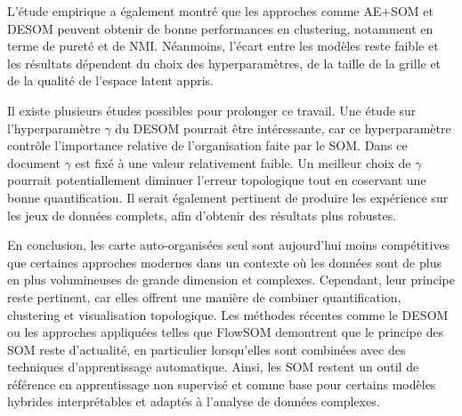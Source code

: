 \documentclass[12pt,a4paper]{report}
\begin{document}
L'étude empirique a également montré que les approches comme AE+SOM et DESOM peuvent obtenir de bonne performances en clustering,
notamment en terme de pureté et de NMI. Néanmoins, l'écart entre les modèles reste faible et les résultats dépendent du choix 
des hyperparamètres, de la taille de la grille et de la qualité de l'espace latent appris.

Il existe plusieurs études possibles pour prolonger ce travail.
Une étude sur l'hyperparamètre $\gamma$ du DESOM pourrait être intéressante, car ce hyperparamètre contrôle l'importance relative de l'organisation faite par le SOM.
Dans ce document $\gamma$ est fixé à une valeur relativement faible. Un meilleur choix de $\gamma$ pourrait 
potentiallement diminuer l'erreur topologique tout en coservant une bonne quantification.
Il serait également pertinent de produire les expérience sur les jeux de données complets, afin d'obtenir des résultats plus robustes.

En conclusion, les carte auto-organisées seul sont aujourd'hui moins compétitives que certaines approches modernes dans un contexte où les données 
sont de plus en plus volumineuses de grande dimension et complexes.
Cependant, leur principe reste pertinent, car elles offrent une manière de combiner quantification, clustering et visualisation topologique.
Les méthodes récentes comme le DESOM ou les approches appliquées telles que FlowSOM demontrent que le principe des SOM reste d'actualité, en particulier
lorsqu'elles sont combinées avec des techniques d'apprentissage automatique.
Ainsi, les SOM restent un outil de référence en apprentissage non 
supervisé et comme base pour certains modèles hybrides interprétables et adaptés à l'analyse de données complexes.




\end{document}
